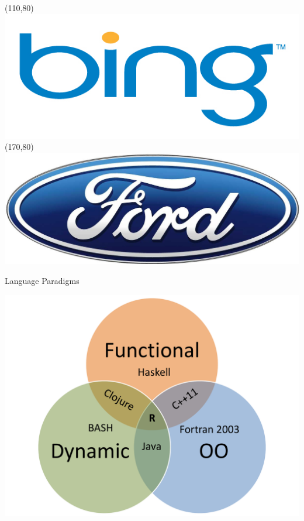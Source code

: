 \begin{frame}
\Put(110,80){\includegraphics[scale=.12]{../common/pics/R_using_logos/bing}}
\Put(170,80){\includegraphics[scale=.29]{../common/pics/R_using_logos/ford}}
\end{frame}



\begin{frame}
  \begin{block}{Language Paradigms}\pause
  \begin{center}
    \includegraphics[scale=.35]{../common/pics/languages}
  \end{center}
  \end{block}
\end{frame}

